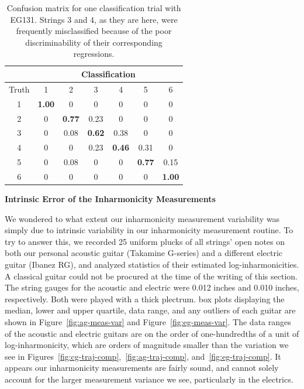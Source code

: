 \documentclass[12pt]{cmuthesis}
\begin{document}
\begin{table}
\begin{center}
\begin{tabular}{|c||c|c|c|c|c|c|}
\hline
& \multicolumn{6}{|c|}{Classification} \\
\hline
Truth &1	&2	&3	&4	&5	&6\\
\hline
\hline
1	&\bf{1.00}	& 0	& 0	& 0	&0	& 0 \\ 
\hline
2	&0	& \bf{0.77}	& 0.23	& 0	&0	& 0 \\
\hline
3	&0	& 0.08	& \bf{0.62}	&0.38	& 0	& 0 \\ 
\hline
4	&0	& 0	& 0.23	&\bf{0.46}	& 0.31	& 0 \\
\hline
5	&0	& 0.08	& 0	&0	& \bf{0.77}	& 0.15\\ 
\hline
6	&0	& 0	& 0	&0	&0	& \bf{1.00} \\
\hline
\end{tabular}
\caption{Confusion matrix for one classification trial with EG131. Strings 3 and 4, as they are here, were frequently misclassified because of the poor discriminability of their corresponding regressions.} 
\label{tab:cf-eg}
\end{center}
\end{table}

\textbf{Intrinsic Error of the Inharmonicity Measurements}

We wondered to what extent our inharmonicity measurement variability was simply due to intrinsic variability in our inharmonicity measurement routine. To try to answer this, we recorded 25 uniform plucks of all strings' open notes on both our personal acoustic guitar (Takamine G-series) and a different electric guitar (Ibanez RG), and analyzed statistics of their estimated log-inharmonicities. A classical guitar could not be procured at the time of the writing of this section. The string gauges for the acoustic and electric were 0.012 inches and 0.010 inches, respectively. Both were played with a thick plectrum. box plots displaying the median, lower and upper quartile, data range, and any outliers of each guitar are shown in Figure~\ref{fig:ag-meas-var} and Figure~\ref{fig:eg-meas-var}. The data ranges of the acoustic and electric guitars are on the order of one-hundredths of a unit of log-inharmonicity, which are orders of magnitude smaller than the variation we see in Figures~\ref{fig:cg-traj-comp},~\ref{fig:ag-traj-comp}, and~\ref{fig:eg-traj-comp}. It appears our inharmonicity measurements are fairly sound, and cannot solely account for the larger measurement variance we see, particularly in the electrics. 
\end{document}
